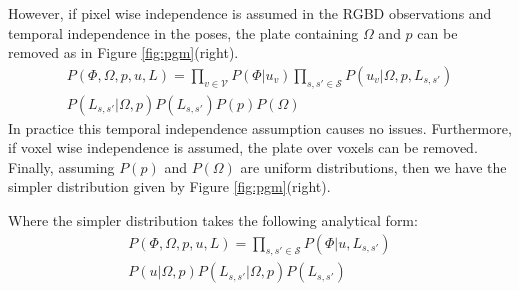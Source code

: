 However, if pixel wise independence is assumed in the RGBD observations and temporal independence in 
the poses, the plate containing $\Omega$ and $p$ can be removed as in Figure \ref{fig:pgm}(right).
\begin{equation}
\begin{split}
P(\Phi, \Omega, p, u, L) = 
\prod_{v \in \mathcal{V}}P(\Phi|u_{v})
\prod_{s, s' \in \mathcal{S}}P(u_{v}|\Omega, p, L_{s, s'}) \\
P(L_{s, s'}|\Omega, p) P(L_{s, s'})P(p)P(\Omega)
\end{split}
\end{equation}
In practice this temporal independence assumption causes no issues. Furthermore, if voxel wise independence is assumed, the plate over voxels can be removed. Finally, assuming $P(p)$ and 
$P(\Omega)$ are uniform distributions, then we have the simpler distribution given by Figure \ref{fig:pgm}(right).

Where the simpler distribution takes the following analytical form:
\begin{equation}
\begin{split}
P(\Phi, \Omega, p, u, L) = 
\prod_{s, s' \in \mathcal{S}} P(\Phi|u, L_{s, s'}) \\
P(u|\Omega, p)
P(L_{s, s'}|\Omega, p)
P(L_{s, s'})
\end{split}
\end{equation}

